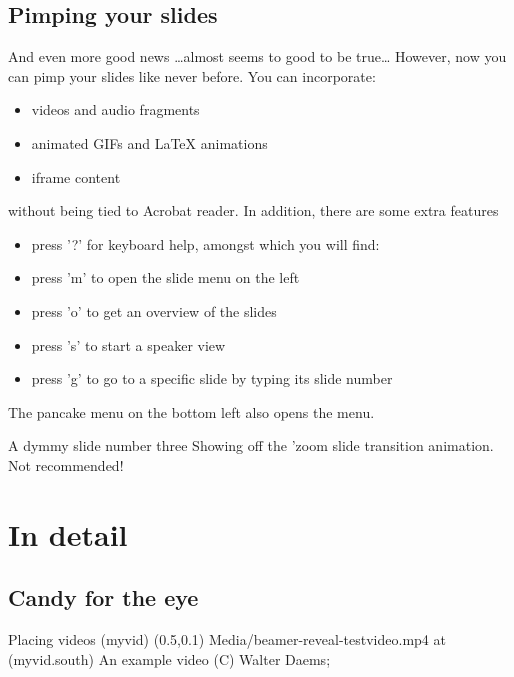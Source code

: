\documentclass[11pt,aspectratio=1610,t]{beamer}%
\begin{document}
\subsection{Pimping your slides}

\begin{frame}
  {And even more good news}
  {\ldots almost seems to good to be true\ldots}
  \small
  However, now you can pimp your slides like never before. You can incorporate:
  \begin{itemize}
  \item videos and audio fragments
  \item animated GIFs and LaTeX animations
  \item iframe content
  \end{itemize}
  without being tied to Acrobat reader.
  In addition, there are some extra features
  \begin{itemize}
  \item press '?' for keyboard help, amongst which you will find:
  \item press 'm' to open the slide menu on the left
  \item press 'o' to get an overview of the slides
  \item press 's' to start a speaker view
  \item press 'g' to go to a specific slide by typing its slide number
  \end{itemize}
  The pancake menu on the bottom left also opens the menu.
\end{frame}



\begin{frame}[transition=zoom]
  {A dymmy slide}
  {number three}
  \vfill
  Showing off the 'zoom slide transition animation. Not recommended!
  \vfill
\end{frame}

\section{In detail}

\subsection{Candy for the eye}

\begin{frame}
  {Placing videos}
  {}
  (myvid) \at (0.5,0.1) {Media/beamer-reveal-testvideo.mp4}
    at (myvid.south)
       {An example video (C) Walter Daems};
\end{frame}
\end{document}
